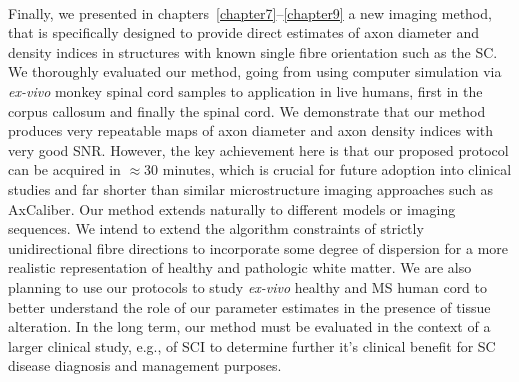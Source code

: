 \paragraph{}
Finally, we presented in chapters~\ref{chapter7}--\ref{chapter9} a new imaging method, that is specifically designed to provide direct estimates of axon diameter and density indices in structures with known single fibre orientation such as the {\gls{SC}}. We thoroughly evaluated our method, going from using computer simulation via \emph{ex-vivo} monkey spinal cord samples to application in live humans, first in the corpus callosum and finally the spinal cord. We demonstrate that our method produces very repeatable maps of axon diameter and axon density indices with very good SNR. However, the key achievement here is that our proposed protocol can be acquired in $\approx$30 minutes, which is crucial for future adoption into clinical studies and far shorter than similar microstructure imaging approaches such as AxCaliber\citep{Assaf:2008}. Our method extends naturally to different models or imaging sequences. We intend to extend the algorithm constraints of strictly unidirectional fibre directions to incorporate some degree of dispersion for a more realistic representation of healthy and pathologic white matter. We are also planning to use our protocols to study \emph{ex-vivo} healthy and MS human cord to better understand the role of our parameter estimates in the presence of tissue alteration. In the long term, our method must be evaluated in the context of a larger clinical study, e.g., of \gls{SCI} to determine further it's clinical benefit for \gls{SC} disease diagnosis and management purposes. 
